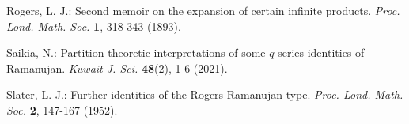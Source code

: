 \documentclass[12pt]{article}
\renewcommand{\(}{\left\(}
\renewcommand{\)}{\right\)}
\renewcommand{\[}{\left[}
\renewcommand{\]}{\right]}
\numberwithin{equation}{section}
\theoremstyle{plain}
\begin{document}
\begin{thebibliography}{100}
	 Rogers, L. J.: Second memoir on the expansion of certain infinite products. \textit{Proc. Lond. Math. Soc.} \textbf{1}, 318-343 (1893).
	
	 Saikia, N.: Partition-theoretic interpretations of some $q$-series identities of Ramanujan. \textit{Kuwait J. Sci.} \textbf{48}(2), 1-6 (2021).
	
	 Slater, L. J.: Further identities of the Rogers-Ramanujan type. \textit{Proc. Lond. Math. Soc.} \textbf{2}, 147-167 (1952).
	
	
	
	
	
	\end{thebibliography}
	
\end{document}
